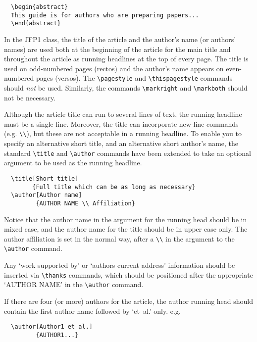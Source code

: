 \documentclass{jfp1}
\begin{document}
\begin{verbatim}
  \begin{abstract}
  This guide is for authors who are preparing papers...
  \end{abstract}
\end{verbatim}

In the JFP1 class, the title of the article and the author's name (or
authors' names) are used both at the beginning of the article for the main
title and throughout the article as running headlines at the top of every
page. The title is used on odd-numbered pages (rectos) and the author's name
appears on even-numbered pages (versos). The \verb"\pagestyle" and
\verb"\thispagestyle" commands should \emph{not} be used.  Similarly, the
commands \verb"\markright" and \verb"\markboth" should not be necessary.

Although the article title can run to several lines of text, the running
headline must be a single line. Moreover, the title can incorporate new-line
commands (e.g. \verb"\\"), but these are not acceptable in a running headline.
To enable you to specify an alternative short title, and an alternative short
author's name, the standard \verb"\title" and \verb"\author" commands have
been extended to take an optional argument to be used as the running headline.
%
\begin{verbatim}
  \title[Short title]
        {Full title which can be as long as necessary}
  \author[Author name]
         {AUTHOR NAME \\ Affiliation}
\end{verbatim}
%
Notice that the author name in the argument for the running head should
be in mixed case, and the author name for the title should be in upper
case only. The author affiliation is set in the normal way, after a
\verb"\\" in the argument to the \verb"\author" command.

Any `work supported by' or `authors current address' information should
be inserted via \verb"\thanks" commands, which should be positioned
after the appropriate `AUTHOR NAME' in the \verb"\author" command.

If there are four (or more) authors for the article, the author running head
should contain the first author name followed by `et~al.' only. e.g.
%
\begin{verbatim}
  \author[Author1 et al.]
         {AUTHOR1...}
\end{verbatim}
\end{document}
